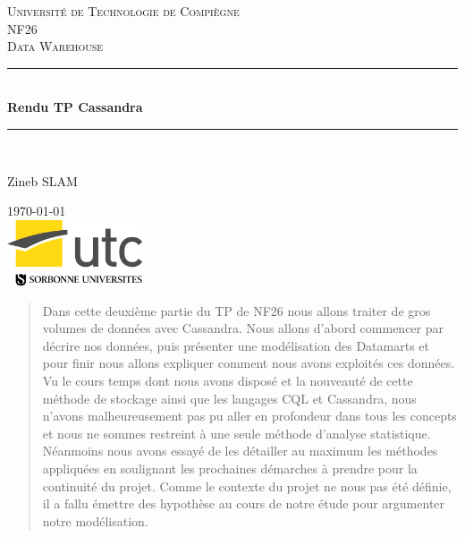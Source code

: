 \documentclass[]{report}
\begin{document}
	
	\begin{titlepage}
		
		\newcommand{\HRule}{\rule{\linewidth}{0.5mm}} 
		
		\center 
		
		\textsc{\LARGE Université de Technologie de Compiègne}\\[1.5cm]
		\textsc{\Large NF26}\\[0.5cm] 
		\textsc{\large Data Warehouse}\\[0.5cm]
		
		\HRule \\[0.4cm]
		{ \huge \bfseries Rendu TP Cassandra}\\[0.4cm] 
		\HRule \\[1.5cm]
		
		
		\begin{center}
			Zineb \textsc{SLAM} 
		\end{center}
		
		{\large \today}\\[2cm] 
		
		\includegraphics[width=40mm]{Figures/utc.jpg}\\ %
		
		\vfill
		
	\end{titlepage}
	
	
	\begin{abstract}
		Dans cette deuxième partie du TP de NF26 nous allons traiter de gros volumes de données avec Cassandra. Nous allons d'abord commencer par décrire nos données, puis présenter une modélisation des Datamarts et pour finir nous allons expliquer comment nous avons exploités ces données. Vu le cours temps dont nous avons disposé et la nouveauté de cette méthode de stockage ainsi que les langages CQL et Cassandra, nous  n'avons malheureusement pas pu aller en profondeur dans tous les concepts et nous ne sommes restreint à une seule méthode d'analyse statistique. Néanmoins nous avons essayé de les détailler au maximum les méthodes appliquées en soulignant les prochaines démarches  à prendre pour la continuité du projet. Comme le contexte du projet ne nous pas été définie, il a fallu émettre des hypothèse au cours de notre étude pour argumenter notre modélisation.
	\end{abstract}
	
\end{document}
